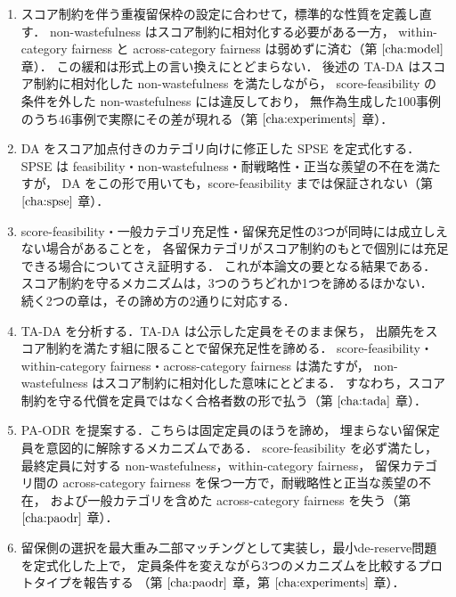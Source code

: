 \documentclass[
    12pt,          %
    a4paper,       %
    oneside,       %
    onecolumn,     %
    titlepage,     %
    final          %
]{jreport} %
\newcommand{\refchapter}[1]{第 $\ref{#1}$ 章}
\begin{document}
\begin{enumerate}
\item スコア制約を伴う重複留保枠の設定に合わせて，標準的な性質を定義し直す．
      non-wastefulness はスコア制約に相対化する必要がある一方，
      within-category fairness と across-category fairness は弱めずに済む（\refchapter{cha:model}）．
      この緩和は形式上の言い換えにとどまらない．
      後述の TA-DA はスコア制約に相対化した non-wastefulness を満たしながら，
      score-feasibility の条件を外した non-wastefulness には違反しており，
      無作為生成した100事例のうち46事例で実際にその差が現れる（\refchapter{cha:experiments}）．
\item DA をスコア加点付きのカテゴリ向けに修正した SPSE を定式化する．
      SPSE は feasibility・non-wastefulness・耐戦略性・正当な羨望の不在を満たすが，
      DA をこの形で用いても，score-feasibility までは保証されない（\refchapter{cha:spse}）．
\item score-feasibility・一般カテゴリ充足性・留保充足性の3つが同時には成立しえない場合があることを，
      各留保カテゴリがスコア制約のもとで個別には充足できる場合についてさえ証明する．
      これが本論文の要となる結果である．
      スコア制約を守るメカニズムは，3つのうちどれか1つを諦めるほかない．
      続く2つの章は，その諦め方の2通りに対応する．
\item TA-DA を分析する．TA-DA は公示した定員をそのまま保ち，
      出願先をスコア制約を満たす組に限ることで留保充足性を諦める．
      score-feasibility・within-category fairness・across-category fairness は満たすが，
      non-wastefulness はスコア制約に相対化した意味にとどまる．
      すなわち，スコア制約を守る代償を定員ではなく合格者数の形で払う（\refchapter{cha:tada}）．
\item PA-ODR を提案する．こちらは固定定員のほうを諦め，
      埋まらない留保定員を意図的に解除するメカニズムである．
      score-feasibility を必ず満たし，最終定員に対する non-wastefulness，within-category fairness，
      留保カテゴリ間の across-category fairness を保つ一方で，耐戦略性と正当な羨望の不在，
      および一般カテゴリを含めた across-category fairness を失う（\refchapter{cha:paodr}）．
\item 留保側の選択を最大重み二部マッチングとして実装し，最小de-reserve問題を定式化した上で，
      定員条件を変えながら3つのメカニズムを比較するプロトタイプを報告する
      （\refchapter{cha:paodr}，\refchapter{cha:experiments}）．
\end{enumerate}
\end{document}
